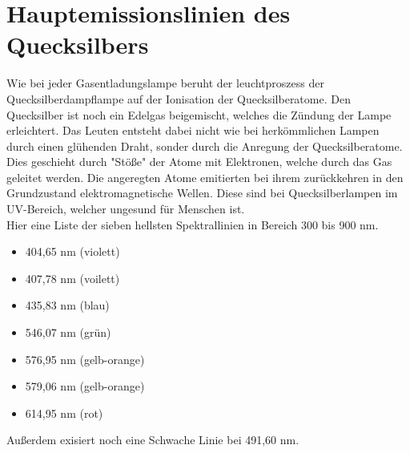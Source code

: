 

\section{Hauptemissionslinien des Quecksilbers}

Wie bei jeder Gasentladungslampe beruht der leuchtproszess der Quecksilberdampflampe auf der Ionisation der Quecksilberatome. Den Quecksilber ist noch ein Edelgas beigemischt, welches
die Zündung der Lampe erleichtert. Das Leuten entsteht dabei nicht wie bei herkömmlichen Lampen durch einen glühenden Draht, sonder durch die Anregung der Quecksilberatome.
Dies geschieht durch "Stöße" der Atome mit Elektronen, welche durch das Gas geleitet werden. Die angeregten Atome emitierten bei ihrem zurückkehren in den Grundzustand elektromagnetische Wellen.
Diese sind bei Quecksilberlampen im UV-Bereich, welcher ungesund für Menschen ist.\\
Hier eine Liste der sieben hellsten Spektrallinien in Bereich 300 bis 900 nm.
\begin{itemize}
    \item 404,65 nm (violett)
    \item 407,78 nm (voilett)
    \item 435,83 nm (blau)
    \item 546,07 nm (grün)
    \item 576,95 nm (gelb-orange)
    \item 579,06 nm (gelb-orange)
    \item 614,95 nm (rot)
\end{itemize}
Außerdem exisiert noch eine Schwache Linie bei 491,60 nm.